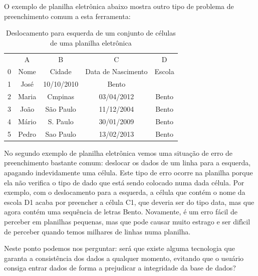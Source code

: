 \documentclass[
12pt,		%
openright,	%
twoside,  %
a4paper,			%
chapter=TITLE,		%
english,			%
french,				%
spanish,			%
brazil				%
]{USPSC-classe/USPSC_RedarTex}
\begin{document}
O exemplo de planilha eletr\^onica abaixo mostra outro tipo de problema de preenchimento comum a esta ferramenta:












\begin{table}[Htb]
\tiny
\caption{\label{596fb4829283dadb41823939479c75b55fbd8223}Deslocamento para esquerda de um conjunto de c\'elulas de uma planilha eletr\^onica}

\centering
\begin{tabular}{|c|c|c|c|c|}
\hline
  &  A  &  B  &  C  &  D  \\
0 & Nome  &  Cidade  &  Data de Nascimento  &  Escola \\
1 & Jos\'e  &  10/10/2010  &  Bento  &   \\
2 & Maria  &  Cmpinas  &  03/04/2012  &  Bento \\
3 & Jo\~ao  &  S\~ao Paulo  &  11/12/2004  &  Bento \\
4 & M\'ario  &  S. Paulo  &  30/01/2009  &  Bento \\
5 & Pedro  &  Sao Paulo  &  13/02/2013  &  Bento \\
\hline
\end{tabular}
\end{table}


No segundo exemplo de planilha eletr\^onica vemos uma situa\c{c}\~ao de erro de preenchimento bastante comum: deslocar os dados de um linha para a esquerda, apagando indevidamente uma c\'elula. Este tipo de erro ocorre na planilha porque ela n\~ao verifica o tipo de dado que est\'a sendo colocado numa dada c\'elula. Por exemplo, com o deslocamento para a esquerda, a c\'elula que cont\'em o nome da escola D1 acaba por preencher a c\'elula C1, que deveria ser do tipo data, mas que agora cont\'em uma sequ\^encia de letras \textquotedbl Bento\textquotedbl . Novamente, \'e um erro f\'acil de perceber em planilhas pequenas, mas que pode causar muito estrago e ser dif\'{\i}cil de perceber quando temos milhares de linhas numa planilha.








Neste ponto podemos nos perguntar: ser\'a que existe alguma tecnologia que garanta a consist\^encia dos dados a qualquer momento, evitando que o usu\'ario consiga entrar dados de forma a prejudicar a integridade da base de dados?
\end{document}
